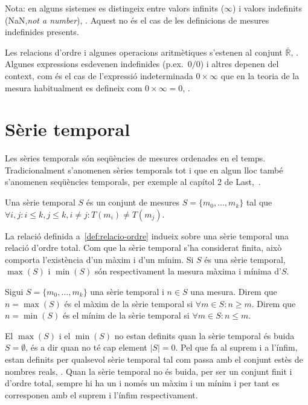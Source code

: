 Nota: en alguns sistemes es distingeix entre valors infinits ($\infty$) i valors indefinits (NaN,\emph{not a number}), \cite{wiki:ieee754}. Aquest no és el cas de les definicions de mesures indefinides presents.

Les relacions d'ordre i algunes operacions aritmètiques s'estenen al
conjunt $\bar{\mathbb{R}}$, \cite{cantrell:extendedreal}.  Algunes
expressions esdevenen indefinides (p.ex.\ $0/0$) i altres depenen del
context, com és el cas de l'expressió indeterminada $0 \times \infty$ que
en la teoria de la mesura habitualment es defineix com $0 \times
\infty = 0$, \cite{wiki:extendedreal}.


\section{Sèrie temporal}
\label{sec:model:serietemporal}

Les sèries temporals són seqüències de mesures ordenades en el temps. 
Tradicionalment s'anomenen sèries temporals tot i que en algun lloc també s'anomenen seqüències temporals, per exemple al capítol 2 de Last,~\cite{last}.


\begin{definition}
  Una sèrie temporal $S$ és un conjunt de mesures
  $S=\{m_0,\ldots,m_k\}$ tal que 
  $\forall i,j: i\leq k, j\leq k, i\neq j : T(m_i)\neq T(m_j)$.
\end{definition}

La relació definida a~\ref{def:relacio-ordre} indueix sobre una sèrie
temporal una relació d'ordre total. Com que la sèrie temporal s'ha
considerat finita, això comporta l'existència d'un màxim i d'un mínim.
Si $S$ és una sèrie temporal, $\max(S)$ i $\min(S)$ són respectivament
la mesura màxima i mínima d'$S$. 

\begin{definition}
  Sigui $S=\{m_0,\ldots,m_k\}$ una sèrie temporal i $n\in S$ una
  mesura.  Direm que $n=\max(S)$ és el màxim de la sèrie temporal si
  $\forall m \in S: n \geq m $.  Direm que $n=\min(S)$ és el mínim de
  la sèrie temporal si $\forall m \in S: n \leq m$.
\end{definition}

El $\max(S)$ i el $\min(S)$ no estan definits quan la sèrie temporal
és buida $S= \emptyset$, és a dir quan no té cap element $|S|=0$. Pel
que fa al suprem i a l'ínfim, estan definits per qualsevol sèrie
temporal tal com passa amb el conjunt estès de nombres reals,
\cite{cantrell:extendedreal}.  Quan la sèrie temporal no és buida, per
ser un conjunt finit i d'ordre total, sempre hi ha un i només un màxim
i un mínim i per tant es corresponen amb el suprem i l'ínfim
respectivament.

